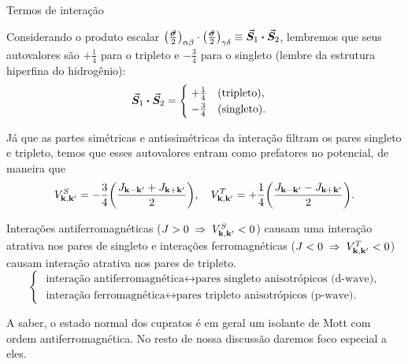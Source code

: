\documentclass[a4paper,10pt]{article}
\begin{document}
\begin{section}{Termos de interação}
\n

Considerando o produto escalar $\qty(\frac{\va*{\s}}{2})_{\alpha\beta} \cdot \qty(\frac{\va*{\s}}{2})_{\gamma\delta} \equiv \va*{S}_1 \vdot \va*{S}_2$, lembremos que seus autovalores são $+\frac{1}{4}$ para o tripleto e $-\frac{3}{4}$ para o singleto (lembre da estrutura hiperfina do hidrogênio):
$$
\va*{S}_1 \vdot \va*{S}_2 =
\begin{cases}
\; +\frac{1}{4} \quad \text{(tripleto)}, \\
\; -\frac{3}{4} \quad \text{(singleto)}.
\end{cases}
$$



Já que as partes simétricas e antissimétricas da interação filtram os pares singleto e tripleto, temos que esses autovalores entram como prefatores no potencial, de maneira que
$$
V_{\vb{k},\vb{k}'}^S = -\frac{3}{4} \qty(\frac{J_{\vb{k}-\vb{k}'} + J_{\vb{k}+\vb{k}'}}{2}), \quad
V_{\vb{k},\vb{k}'}^T = +\frac{1}{4} \qty(\frac{J_{\vb{k}-\vb{k}'} - J_{\vb{k}+\vb{k}'}}{2}).
$$

Interações antiferromagnéticas ($J > 0 \; \Rightarrow \; V_{\vb{k},\vb{k}'}^S < 0$) causam uma interação atrativa nos pares de singleto e interações ferromagnéticas ($J < 0 \; \Rightarrow \; V_{\vb{k},\vb{k}'}^T < 0$) causam interação atrativa nos pares de tripleto.
$$
\begin{cases}
\; \text{interação antiferromagnética} \leftrightarrow \text{pares singleto anisotrópicos (d-wave),} \\
\; \text{interação ferromagnética} \leftrightarrow \text{pares tripleto anisotrópicos (p-wave).}
\end{cases}
$$

A saber, o estado normal dos cupratos é em geral um isolante de Mott com ordem antiferromagnética. No resto de nossa discussão daremos foco especial a eles.

\end{section}

\end{document}
